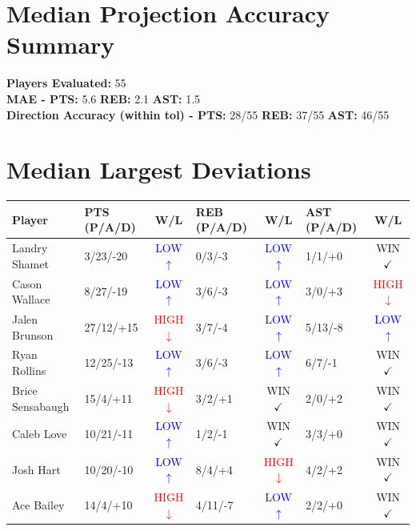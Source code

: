 \documentclass{article}
\begin{document}
\section*{Median Projection Accuracy Summary}
\textbf{Players Evaluated:} 55 \\
\textbf{MAE - PTS:} 5.6 \quad \textbf{REB:} 2.1 \quad \textbf{AST:} 1.5 \\
\textbf{Direction Accuracy (within tol) - PTS:} 28/55 \quad \textbf{REB:} 37/55 \quad \textbf{AST:} 46/55

\section*{Median Largest Deviations}
\begin{table}[h]
\centering
\begin{tabular}{llclclc}
\toprule
\textbf{Player} & \textbf{PTS (P/A/D)} & \textbf{W/L} & \textbf{REB (P/A/D)} & \textbf{W/L} & \textbf{AST (P/A/D)} & \textbf{W/L} \\
\midrule
Landry Shamet & 3/23/-20 & \textcolor{blue}{LOW $\uparrow$} & 0/3/-3 & \textcolor{blue}{LOW $\uparrow$} & 1/1/+0 & \textcolor{green!70!black}{WIN $\checkmark$} \\
Cason Wallace & 8/27/-19 & \textcolor{blue}{LOW $\uparrow$} & 3/6/-3 & \textcolor{blue}{LOW $\uparrow$} & 3/0/+3 & \textcolor{red}{HIGH $\downarrow$} \\
Jalen Brunson & 27/12/+15 & \textcolor{red}{HIGH $\downarrow$} & 3/7/-4 & \textcolor{blue}{LOW $\uparrow$} & 5/13/-8 & \textcolor{blue}{LOW $\uparrow$} \\
Ryan Rollins & 12/25/-13 & \textcolor{blue}{LOW $\uparrow$} & 3/6/-3 & \textcolor{blue}{LOW $\uparrow$} & 6/7/-1 & \textcolor{green!70!black}{WIN $\checkmark$} \\
Brice Sensabaugh & 15/4/+11 & \textcolor{red}{HIGH $\downarrow$} & 3/2/+1 & \textcolor{green!70!black}{WIN $\checkmark$} & 2/0/+2 & \textcolor{green!70!black}{WIN $\checkmark$} \\
Caleb Love & 10/21/-11 & \textcolor{blue}{LOW $\uparrow$} & 1/2/-1 & \textcolor{green!70!black}{WIN $\checkmark$} & 3/3/+0 & \textcolor{green!70!black}{WIN $\checkmark$} \\
Josh Hart & 10/20/-10 & \textcolor{blue}{LOW $\uparrow$} & 8/4/+4 & \textcolor{red}{HIGH $\downarrow$} & 4/2/+2 & \textcolor{green!70!black}{WIN $\checkmark$} \\
Ace Bailey & 14/4/+10 & \textcolor{red}{HIGH $\downarrow$} & 4/11/-7 & \textcolor{blue}{LOW $\uparrow$} & 2/2/+0 & \textcolor{green!70!black}{WIN $\checkmark$} \\

\end{tabular}
\end{table}
\end{document}
